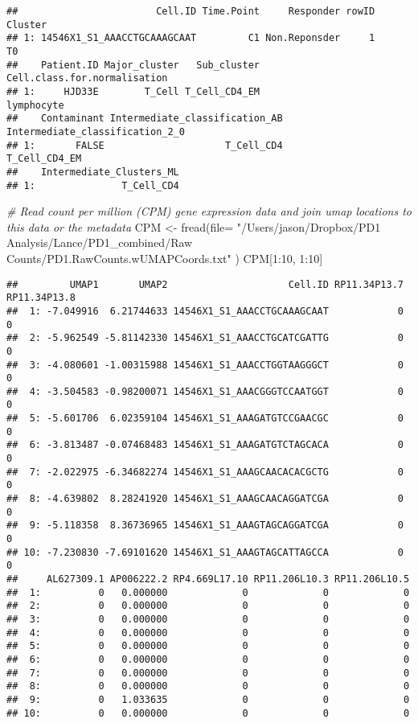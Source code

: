 \documentclass[
]{article}
\newenvironment{Shaded}{\begin{snugshade}}{\end{snugshade}}
\newcommand{\AttributeTok}[1]{\textcolor[rgb]{0.77,0.63,0.00}{#1}}
\newcommand{\CommentTok}[1]{\textcolor[rgb]{0.56,0.35,0.01}{\textit{#1}}}
\newcommand{\DecValTok}[1]{\textcolor[rgb]{0.00,0.00,0.81}{#1}}
\newcommand{\FunctionTok}[1]{\textcolor[rgb]{0.00,0.00,0.00}{#1}}
\newcommand{\NormalTok}[1]{#1}
\newcommand{\OtherTok}[1]{\textcolor[rgb]{0.56,0.35,0.01}{#1}}
\newcommand{\SpecialCharTok}[1]{\textcolor[rgb]{0.00,0.00,0.00}{#1}}
\newcommand{\StringTok}[1]{\textcolor[rgb]{0.31,0.60,0.02}{#1}}
\begin{document}
\begin{verbatim}
##                        Cell.ID Time.Point     Responder rowID Cluster
## 1: 14546X1_S1_AAACCTGCAAAGCAAT         C1 Non.Reponsder     1      T0
##    Patient.ID Major_cluster   Sub_cluster Cell.class.for.normalisation
## 1:     HJD33E        T_Cell T_Cell_CD4_EM                   lymphocyte
##    Contaminant Intermediate_classification_AB Intermediate_classification_2_0
## 1:       FALSE                     T_Cell_CD4                   T_Cell_CD4_EM
##    Intermediate_Clusters_ML
## 1:               T_Cell_CD4
\end{verbatim}

\begin{Shaded}
\begin{Highlighting}[]
\CommentTok{\# Read count per million (CPM) gene expression data and join umap locations to this data or the metadata}
\NormalTok{CPM  }\OtherTok{\textless{}{-}} \FunctionTok{fread}\NormalTok{(}\AttributeTok{file=} \StringTok{"/Users/jason/Dropbox/PD1 Analysis/Lance/PD1\_combined/Raw Counts/PD1.RawCounts.wUMAPCoords.txt"}\NormalTok{ ) }
\NormalTok{CPM[}\DecValTok{1}\SpecialCharTok{:}\DecValTok{10}\NormalTok{, }\DecValTok{1}\SpecialCharTok{:}\DecValTok{10}\NormalTok{] }
\end{Highlighting}
\end{Shaded}

\begin{verbatim}
##         UMAP1       UMAP2                     Cell.ID RP11.34P13.7 RP11.34P13.8
##  1: -7.049916  6.21744633 14546X1_S1_AAACCTGCAAAGCAAT            0            0
##  2: -5.962549 -5.81142330 14546X1_S1_AAACCTGCATCGATTG            0            0
##  3: -4.080601 -1.00315988 14546X1_S1_AAACCTGGTAAGGGCT            0            0
##  4: -3.504583 -0.98200071 14546X1_S1_AAACGGGTCCAATGGT            0            0
##  5: -5.601706  6.02359104 14546X1_S1_AAAGATGTCCGAACGC            0            0
##  6: -3.813487 -0.07468483 14546X1_S1_AAAGATGTCTAGCACA            0            0
##  7: -2.022975 -6.34682274 14546X1_S1_AAAGCAACACACGCTG            0            0
##  8: -4.639802  8.28241920 14546X1_S1_AAAGCAACAGGATCGA            0            0
##  9: -5.118358  8.36736965 14546X1_S1_AAAGTAGCAGGATCGA            0            0
## 10: -7.230830 -7.69101620 14546X1_S1_AAAGTAGCATTAGCCA            0            0
##     AL627309.1 AP006222.2 RP4.669L17.10 RP11.206L10.3 RP11.206L10.5
##  1:          0   0.000000             0             0             0
##  2:          0   0.000000             0             0             0
##  3:          0   0.000000             0             0             0
##  4:          0   0.000000             0             0             0
##  5:          0   0.000000             0             0             0
##  6:          0   0.000000             0             0             0
##  7:          0   0.000000             0             0             0
##  8:          0   0.000000             0             0             0
##  9:          0   1.033635             0             0             0
## 10:          0   0.000000             0             0             0
\end{verbatim}
\end{document}
